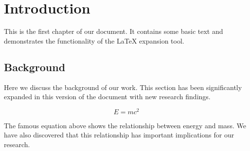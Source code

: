 \section{Introduction}

This is the first chapter of our document. It contains some basic text
and demonstrates the functionality of the LaTeX expansion tool.

\subsection{Background}

Here we discuss the background of our work. This section has been significantly
expanded in this version of the document with new research findings.

\begin{equation}
E = mc^2
\end{equation}

The famous equation above shows the relationship between energy and mass.
We have also discovered that this relationship has important implications
for our research.
